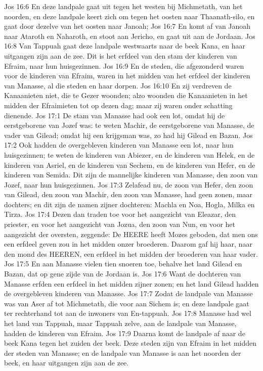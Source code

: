 Jos 16:6  En deze landpale gaat uit tegen het westen bij Michmetath, van het noorden, en deze landpale keert zich om tegen het oosten naar Thaanath-silo, en gaat door dezelve van het oosten naar Janoah;
Jos 16:7  En komt af van Janoah naar Ataroth en Naharoth, en stoot aan Jericho, en gaat uit aan de Jordaan.
Jos 16:8  Van Tappuah gaat deze landpale westwaarts naar de beek Kana, en haar uitgangen zijn aan de zee. Dit is het erfdeel van den stam der kinderen van Efraim, naar hun huisgezinnen.
Jos 16:9  En de steden, die afgezonderd waren voor de kinderen van Efraim, waren in het midden van het erfdeel der kinderen van Manasse, al die steden en haar dorpen.
Jos 16:10  En zij verdreven de Kanaanieten niet, die te Gezer woonden; alzo woonden die Kanaanieten in het midden der Efraimieten tot op dezen dag; maar zij waren onder schatting dienende.
Jos 17:1  De stam van Manasse had ook een lot, omdat hij de eerstgeborene van Jozef was: te weten Machir, de eerstgeborene van Manasse, de vader van Gilead; omdat hij een krijgsman was, zo had hij Gilead en Bazan.
Jos 17:2  Ook hadden de overgebleven kinderen van Manasse een lot, naar hun huisgezinnen; te weten de kinderen van Abiezer, en de kinderen van Helek, en de kinderen van Asriel, en de kinderen van Sechem, en de kinderen van Hefer, en de kinderen van Semida. Dit zijn de mannelijke kinderen van Manasse, den zoon van Jozef, naar hun huisgezinnen.
Jos 17:3  Zelafead nu, de zoon van Hefer, den zoon van Gilead, den zoon van Machir, den zoon van Manasse, had geen zonen, maar dochters; en dit zijn de namen zijner dochteren: Machla en Noa, Hogla, Milka en Tirza.
Jos 17:4  Dezen dan traden toe voor het aangezicht van Eleazar, den priester, en voor het aangezicht van Jozua, den zoon van Nun, en voor het aangezicht der oversten, zeggende: De HEERE heeft Mozes geboden, dat men ons een erfdeel geven zou in het midden onzer broederen. Daarom gaf hij haar, naar den mond des HEEREN, een erfdeel in het midden der broederen van haar vader.
Jos 17:5  En aan Manasse vielen tien snoeren toe, behalve het land Gilead en Bazan, dat op gene zijde van de Jordaan is.
Jos 17:6  Want de dochteren van Manasse erfden een erfdeel in het midden zijner zonen; en het land Gilead hadden de overgebleven kinderen van Manasse.
Jos 17:7  Zodat de landpale van Manasse was van Aser af tot Michmetath, die voor aan Sichem is; en deze landpale gaat ter rechterhand tot aan de inwoners van En-tappuah.
Jos 17:8  Manasse had wel het land van Tappuah, maar Tappuah zelve, aan de landpale van Manasse, hadden de kinderen van Efraim.
Jos 17:9  Daarna komt de landpale af naar de beek Kana tegen het zuiden der beek. Deze steden zijn van Efraim in het midden der steden van Manasse; en de landpale van Manasse is aan het noorden der beek, en haar uitgangen zijn aan de zee.
